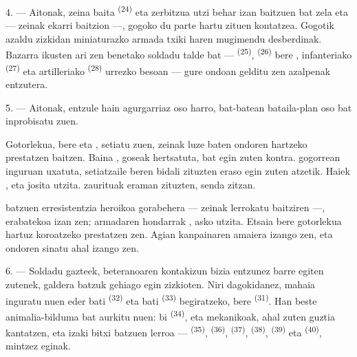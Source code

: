 \VUsaut{4.0mm}
\VUsaut{2.8mm}

4. --- Aitonak, zeina  baita \textsuperscript{(24)} eta zerbitzua
utzi behar izan baitzuen  bat zela eta --- zeinak
 ekarri baitzion ---, gogoko du parte hartu zituen
 kontatzea. Gogotik azaldu zizkidan miniaturazko armada txiki
haren mugimendu desberdinak. Bazarra ikusten ari zen benetako soldadu talde bat ---
 \textsuperscript{(25)}, 
\textsuperscript{(26)} bere , infanteriako
 \textsuperscript{(27)} eta artilleriako
 \textsuperscript{(28)} urrezko  besoan ---
gure ondoan gelditu zen azalpenak entzutera.

5. --- Aitonak, entzule hain agurgarriaz oso harro, bat-batean bataila-plan oso bat
inprobisatu zuen.

Gotorlekua, bere  eta , 
setiatu zuen, zeinak  luze baten ondoren
 hartzeko prestatzen baitzen. Baina , goseak
hertsatuta,  bat egin zuten 
 kontra.   gogorrean
 inguruan uxatuta, setiatzaile  beren
 bidali zituzten  eraso egin zuten
 atzetik. Haiek , 
 eta  josita utzita. 
zaurituak  eraman zituzten,
 senda zitzan.

 batzuen erresistentzia heroikoa gorabehera --- zeinak
 lerrokatu baitziren ---,  erabatekoa izan zen;
armadaren hondarrak ,  asko utzita. Etsaia
bere  gotorlekua hartuz koroatzeko prestatzen zen. Agian
kanpainaren amaiera izango zen, eta  ondoren
 sinatu ahal izango zen.

\VUsaut{4.4mm}
\VUsaut{2.8mm}

6. --- Soldadu gazteek, beteranoaren kontakizun bizia entzunez barre egiten
zutenek, galdera batzuk gehiago egin zizkioten. Niri dagokidanez, mahaia inguratu
nuen  eder bati \textsuperscript{(32)} eta  bati
\textsuperscript{(33)} begiratzeko, bere 
\textsuperscript{(31)}. Han beste animalia-bilduma bat aurkitu nuen: bi
 \textsuperscript{(34)},  eta
 mekanikoak, ahal zuten guztia kantatzen, eta izaki bitxi
batzuen lerroa ---  \textsuperscript{(35)},
 \textsuperscript{(36)}, 
\textsuperscript{(37)},  \textsuperscript{(38)},
 \textsuperscript{(39)} eta 
\textsuperscript{(40)}, mintzez eginak.

